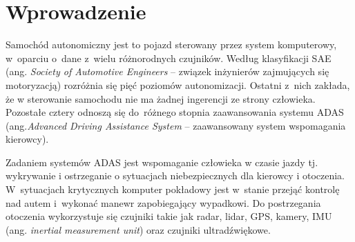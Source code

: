\chapter{Wprowadzenie}

Samochód  autonomiczny jest to pojazd sterowany przez system komputerowy, w~oparciu o~dane z~wielu różnorodnych czujników. 
Według klasyfikacji SAE (ang. \textit{Society of Automotive Engineers} -- związek inżynierów zajmujących się motoryzacją) rozróżnia się pięć poziomów autonomizacji. 
Ostatni z~nich zakłada, że w sterowanie samochodu nie ma żadnej ingerencji ze strony człowieka. 
Pozostałe cztery odnoszą się do~różnego stopnia zaawansowania systemu ADAS (ang.\textit{Advanced Driving Assistance System} -- zaawansowany system wspomagania kierowcy).

Zadaniem systemów ADAS jest wspomaganie człowieka w czasie jazdy tj. wykrywanie i ostrzeganie o sytuacjach niebezpiecznych dla kierowcy i otoczenia. 
W~sytuacjach krytycznych komputer pokładowy jest w~stanie przejąć kontrolę nad autem i~wykonać manewr zapobiegający wypadkowi. 
Do postrzegania otoczenia wykorzystuje się czujniki takie jak radar, lidar, GPS, kamery, IMU (ang. \textit{inertial measurement unit}) oraz czujniki ultradźwiękowe.



